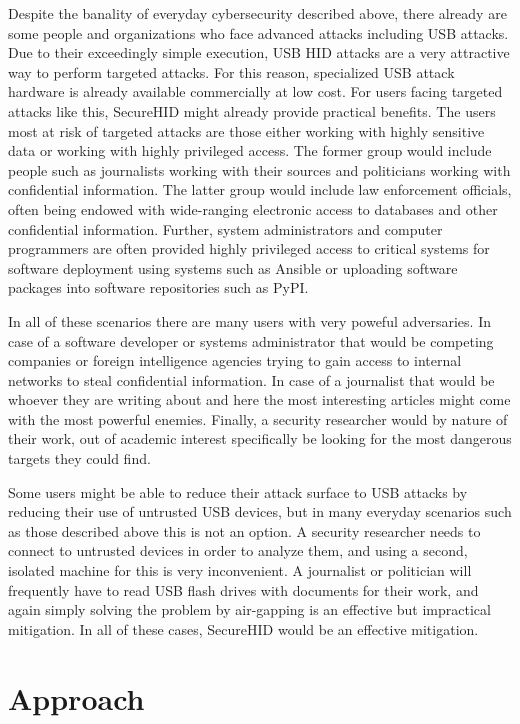 \documentclass[12pt,a4paper,notitlepage]{article}
\begin{document}
Despite the banality of everyday cybersecurity described above, there already are some people and organizations who face
advanced attacks including USB attacks. Due to their exceedingly simple execution, USB HID attacks are a very attractive
way to perform targeted attacks. For this reason, specialized USB attack hardware is already available commercially at
low cost. For users facing targeted attacks like this, SecureHID might already provide practical benefits.
The users most at risk of targeted attacks are those either working with highly sensitive data or working with highly
privileged access. The former group would include people such as journalists working with their sources and politicians
working with confidential information. The latter group would include law enforcement officials, often being endowed
with wide-ranging electronic access to databases and other confidential information. Further, system administrators and
computer programmers are often provided highly privileged access to critical systems for software deployment using
systems such as Ansible or uploading software packages into software repositories such as PyPI.

In all of these scenarios there are many users with very poweful adversaries. In case of a software developer or systems
administrator that would be competing companies or foreign intelligence agencies trying to gain access to internal
networks to steal confidential information. In case of a journalist that would be whoever they are writing about and
here the most interesting articles might come with the most powerful enemies. Finally, a security researcher would by
nature of their work, out of academic interest specifically be looking for the most dangerous targets they could find.

Some users might be able to reduce their attack surface to USB attacks by reducing their use of untrusted USB devices,
but in many everyday scenarios such as those described above this is not an option. A security researcher needs to
connect to untrusted devices in order to analyze them, and using a second, isolated machine for this is very
inconvenient. A journalist or politician will frequently have to read USB flash drives with documents for their work,
and again simply solving the problem by air-gapping is an effective but impractical mitigation. In all of these cases,
SecureHID would be an effective mitigation.

\section{Approach}
\end{document}
